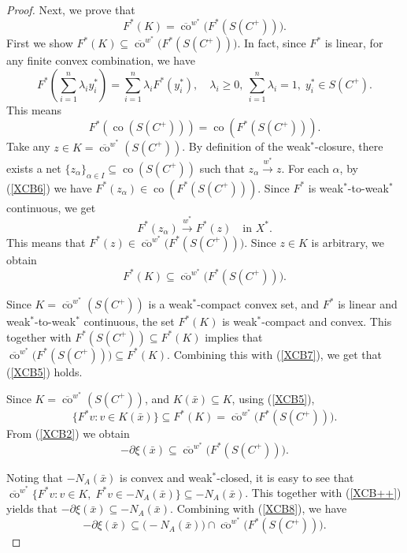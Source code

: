 \documentclass[11pt]{article}
\begin{document}
\begin{proof}
	Next, we prove that
\begin{equation}\label{XCB5}
	F^*(K) = \overline{\operatorname{co}}^{w^*}\bigl( F^*(S(C^{+})) \bigr).  
 \end{equation}
	First we show $F^*(K) \subseteq \overline{\operatorname{co}}^{w^*}\bigl( F^*(S(C^{+})) \bigr)$.
In fact,	since $F^*$ is linear, for any finite convex combination, we have
	\[
	F^*\left( \sum_{i=1}^n \lambda_i y_i^* \right) = \sum_{i=1}^n \lambda_i F^*(y_i^*), \quad \lambda_i \ge 0,\ \sum_{i=1}^n \lambda_i = 1, \;  y_i^* \in S(C^+).
	\]
	This means
\begin{equation}\label{XCB6}
	F^*(\operatorname{co}(S(C^+))) = \operatorname{co}( F^*(S(C^+)) ).  
 \end{equation}
	Take any $z \in K = \overline{\operatorname{co}}^{w^*}(S(C^+))$. By definition of the weak$^*$-closure, there exists a net $\{z_\alpha\}_{\alpha \in I} \subseteq \operatorname{co}(S(C^+))$ such that $z_\alpha \xrightarrow{w^*} z$.
	For each $\alpha$, by (\ref{XCB6}) we have $F^*(z_\alpha) \in \operatorname{co}(F^*(S(C^+)))$. Since $F^*$ is weak$^*$-to-weak$^*$ continuous, we get 
	\[
	F^*(z_\alpha) \xrightarrow{w^*} F^*(z) \quad \text{in } X^*.
	\]
 This means that
$	F^*(z) \in \overline{\operatorname{co}}^{w^*}\bigl( F^*(S(C^+)) \bigr).$
	Since $z \in K$ is arbitrary, we obtain 
	\begin{equation}\label{XCB7}
	F^*(K) \subseteq \overline{\operatorname{co}}^{w^*}\bigl( F^*(S(C^+)) \bigr).
	 \end{equation}
	 
	Since $K = \overline{\operatorname{co}}^{w^*}(S(C^+))$ is   a   weak$^*$-compact convex set, and $F^*$ is   linear and weak$^*$-to-weak$^*$ continuous, the set $F^*(K)$ is weak$^*$-compact and convex. This together with $F^*(S(C^+)) \subseteq F^*(K)$  implies that
$	\overline{\operatorname{co}}^{w^*} \bigl( F^*(S(C^+)) \bigr) \subseteq F^*(K).$   Combining this with (\ref{XCB7}), we get that (\ref{XCB5})  holds.
	
 
	Since $K = \overline{\operatorname{co}}^{w^*}(S(C^{+}))$, and $K(\bar{x}) \subseteq K$, using (\ref{XCB5}),
	\[
	\{ F^*v : v \in K(\bar{x}) \} \subseteq F^*(K) = \overline{\operatorname{co}}^{w^*}\bigl( F^*(S(C^{+})) \bigr).
	\]
	From (\ref{XCB2}) we obtain
		\begin{equation}\label{XCB8}
	- \partial \xi(\bar{x}) \subseteq \overline{\operatorname{co}}^{w^*} \bigl( F^*(S(C^{+})) \bigr).  
	 \end{equation}
	
Noting that   $-N_A(\bar{x})$ is convex and weak$^*$-closed, 	it is easy to see that $ \overline{\operatorname{co}}^{w^*} \bigl\{ F^*v : v \in K,\; F^*v \in -N_A(\bar{x}) \bigr\}    \subseteq -N_A(\bar{x})$. 	This together with  (\ref{XCB++})  yields that   $-\partial \xi(\bar{x}) \subseteq -N_A(\bar{x})$.
		Combining with (\ref{XCB8}), we have
	\[
	- \partial \xi(\bar{x}) \subseteq \bigl( -N_A(\bar{x}) \bigr) \cap \overline{\operatorname{co}}^{w^*} \bigl( F^*(S(C^{+})) \bigr).
	\]
	

\end{proof}
\end{document}

